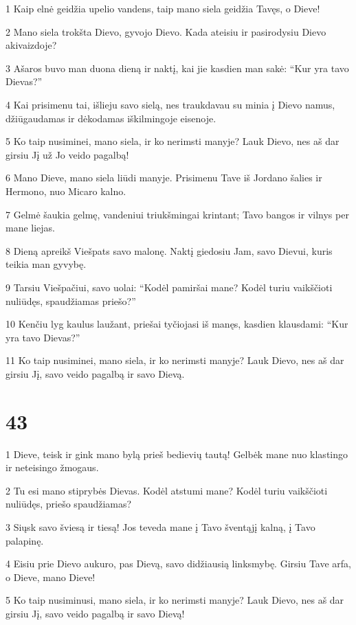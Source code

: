 \par 1 Kaip elnė geidžia upelio vandens, taip mano siela geidžia Tavęs, o Dieve! 
\par 2 Mano siela trokšta Dievo, gyvojo Dievo. Kada ateisiu ir pasirodysiu Dievo akivaizdoje? 
\par 3 Ašaros buvo man duona dieną ir naktį, kai jie kasdien man sakė: “Kur yra tavo Dievas?” 
\par 4 Kai prisimenu tai, išlieju savo sielą, nes traukdavau su minia į Dievo namus, džiūgaudamas ir dėkodamas iškilmingoje eisenoje. 
\par 5 Ko taip nusiminei, mano siela, ir ko nerimsti manyje? Lauk Dievo, nes aš dar girsiu Jį už Jo veido pagalbą! 
\par 6 Mano Dieve, mano siela liūdi manyje. Prisimenu Tave iš Jordano šalies ir Hermono, nuo Micaro kalno. 
\par 7 Gelmė šaukia gelmę, vandeniui triukšmingai krintant; Tavo bangos ir vilnys per mane liejas. 
\par 8 Dieną apreikš Viešpats savo malonę. Naktį giedosiu Jam, savo Dievui, kuris teikia man gyvybę. 
\par 9 Tarsiu Viešpačiui, savo uolai: “Kodėl pamiršai mane? Kodėl turiu vaikščioti nuliūdęs, spaudžiamas priešo?” 
\par 10 Kenčiu lyg kaulus laužant, priešai tyčiojasi iš manęs, kasdien klausdami: “Kur yra tavo Dievas?” 
\par 11 Ko taip nusiminei, mano siela, ir ko nerimsti manyje? Lauk Dievo, nes aš dar girsiu Jį, savo veido pagalbą ir savo Dievą.



\chapter{43}


\par 1 Dieve, teisk ir gink mano bylą prieš bedievių tautą! Gelbėk mane nuo klastingo ir neteisingo žmogaus. 
\par 2 Tu esi mano stiprybės Dievas. Kodėl atstumi mane? Kodėl turiu vaikščioti nuliūdęs, priešo spaudžiamas? 
\par 3 Siųsk savo šviesą ir tiesą! Jos teveda mane į Tavo šventąjį kalną, į Tavo palapinę. 
\par 4 Eisiu prie Dievo aukuro, pas Dievą, savo didžiausią linksmybę. Girsiu Tave arfa, o Dieve, mano Dieve! 
\par 5 Ko taip nusiminusi, mano siela, ir ko nerimsti manyje? Lauk Dievo, nes aš dar girsiu Jį, savo veido pagalbą ir savo Dievą!



